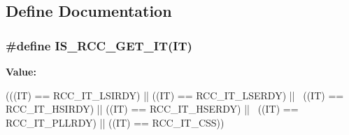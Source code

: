 \subsection{Define Documentation}
\hypertarget{group__RCC__Interrupt__source_ga7a1b771d6d9c2d8346ab58a1f046f6a6}{
\subsubsection[{IS\_\-RCC\_\-GET\_\-IT}]{\setlength{\rightskip}{0pt plus 5cm}\#define IS\_\-RCC\_\-GET\_\-IT(IT)}}
\label{group__RCC__Interrupt__source_ga7a1b771d6d9c2d8346ab58a1f046f6a6}
{\bfseries Value:}
\begin{DoxyCode}
(((IT) == RCC_IT_LSIRDY) || ((IT) == RCC_IT_LSERDY) || \
                            ((IT) == RCC_IT_HSIRDY) || ((IT) == RCC_IT_HSERDY) ||
       \
                            ((IT) == RCC_IT_PLLRDY) || ((IT) == RCC_IT_CSS))
\end{DoxyCode}
